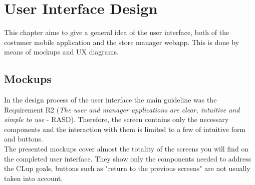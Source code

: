 \documentclass[]{article}
\begin{document}
				
	



	
				
	\newpage			
				
	\section{User Interface Design}
	This chapter aims to give a general idea of the user interface, both of the costumer mobile application and the store manager webapp. 
	This is done by means of mockups and UX diagrams.
		
		\subsection{Mockups}
		In the design process of the user interface the main guideline was the Requirement R2 (\textit{The user and manager applications are clear, intuitive and simple to use} - RASD). Therefore, the screen contains only the necessary components and the interaction with them is limited to a few of intuitive form and buttons.
		\\The presented mockups cover almost the totality of the screens you will find on the completed user interface. They show only the components needed to address the CLup goals, buttons such as "return to the previous screens" are not usually taken into account.
		
\end{document}
